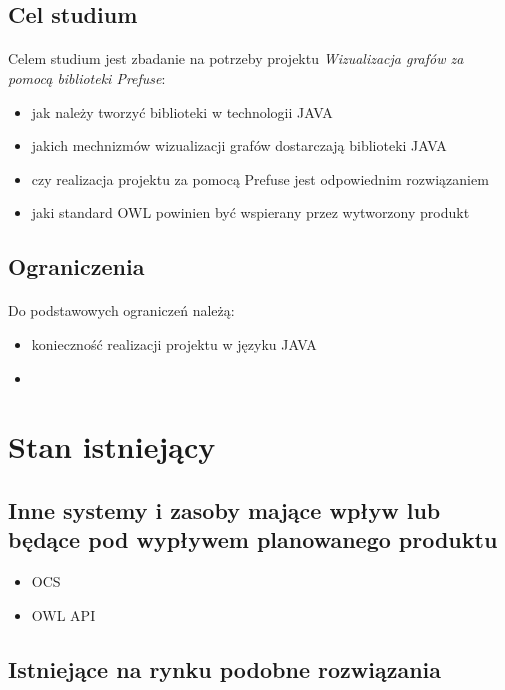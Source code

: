 \documentclass[a4paper,10pt]{article}
\begin{document}
\subsection{Cel studium}
\paragraph{} Celem studium jest zbadanie na potrzeby projektu \textit{Wizualizacja grafów za pomocą biblioteki Prefuse}: 
\begin{itemize}
 	\item jak należy tworzyć biblioteki w technologii JAVA
 	\item jakich mechnizmów wizualizacji grafów dostarczają biblioteki JAVA 
	\item czy realizacja projektu za pomocą Prefuse jest odpowiednim rozwiązaniem
	\item jaki standard OWL powinien być wspierany przez wytworzony produkt
\end{itemize}

\subsection{Ograniczenia}
\paragraph{} Do podstawowych ograniczeń należą:
\begin{itemize}
 	\item konieczność realizacji projektu w języku JAVA
	\item 
\end{itemize}



\section{Stan istniejący}

\subsection{Inne systemy i zasoby mające wpływ lub będące pod wypływem planowanego produktu}

\begin{itemize}
 	\item OCS
	\item OWL API 
\end{itemize}


\subsection{Istniejące na rynku podobne rozwiązania}
\end{document}
